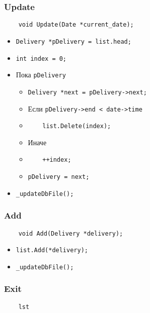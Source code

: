 \subsubsection{Update}

\begin{lstlisting}
    void Update(Date *current_date);
\end{lstlisting}

\begin{itemize}
    \item \verb|Delivery *pDelivery = list.head;|
    \item \verb|int index = 0;|
    \item Пока \verb|pDelivery|
        \begin{itemize}
            \item \verb|Delivery *next = pDelivery->next;|
            \item Если \verb|pDelivery->end < date->time|
            \item \verb|    list.Delete(index);|
            \item Иначе
            \item \verb|    ++index;|
            \item \verb|pDelivery = next;|
        \end{itemize}
    \item \verb|_updateDbFile();|
\end{itemize}

\subsubsection{Add}

\begin{lstlisting}
    void Add(Delivery *delivery);
\end{lstlisting}

\begin{itemize}
    \item \verb|list.Add(*delivery);|
    \item \verb|_updateDbFile();|
\end{itemize}

\subsubsection{Exit}

\begin{lstlisting}
    lst
\end{lstlisting}

